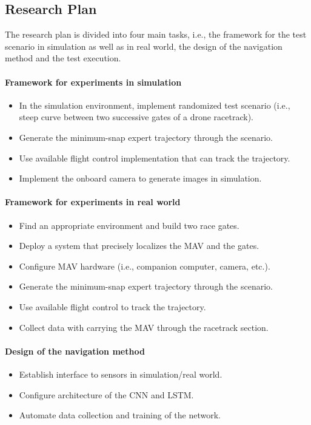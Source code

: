 \subsection{Research Plan}
The research plan is divided into four main tasks, i.e.,
the framework for the test scenario in simulation as well as in real world, the design of the navigation method
and the test execution.



\paragraph{Framework for experiments in simulation}
\begin{itemize}
    \item In the simulation environment, implement randomized test scenario (i.e., steep curve between two successive gates of a drone racetrack).
    \item Generate the minimum-snap expert trajectory through the scenario.
    \item Use available flight control implementation that can track the trajectory.
    \item Implement the onboard camera to generate images in simulation.
\end{itemize}

\paragraph{Framework for experiments in real world}
\begin{itemize}
    \item Find an appropriate environment and build two race gates.
    \item Deploy a system that precisely localizes the MAV and the gates.
    \item Configure MAV hardware (i.e., companion computer, camera, etc.).
    \item Generate the minimum-snap expert trajectory through the scenario.
    \item Use available flight control to track the trajectory.
    \item Collect data with carrying the MAV through the racetrack section.
\end{itemize}
    
\paragraph{Design of the navigation method}
\begin{itemize}
    \item Establish interface to sensors in simulation/real world.
    \item Configure architecture of the CNN and LSTM.
    \item Automate data collection and training of the network.
\end{itemize}

